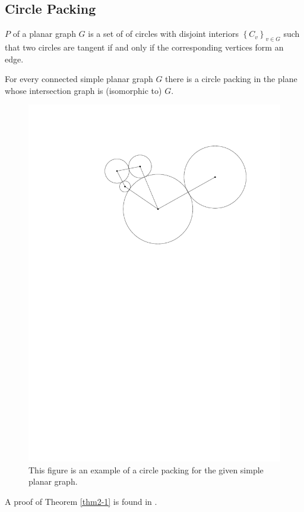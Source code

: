 \subsection{Circle Packing}
\begin{definition}\label{def:circlePacking}
$P$ of a planar graph $G$ is a set of of circles with disjoint
interiors $\left\lbrace C_v \right\rbrace_{v \in G} $ such that two
circles are tangent if and only if the corresponding vertices form an edge.
\cite{arXiv13113363v1}
\end{definition} 
\begin{thm}\label{thm2-1}
For every connected simple planar graph $G$ there is a circle packing in the
plane whose intersection graph is (isomorphic to) $G$.
\end{thm}
\begin{figure}[!ht]
\begin{center}
\includegraphics[scale=.5]{graphics/circlePackingTheoremExample.pdf}
\end{center} 
\caption{This figure is an example of a circle packing for the given simple planar graph.}
\end{figure} 
A proof of Theorem \ref{thm2-1} is found in \cite{stephenson2005introduction}.

